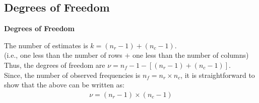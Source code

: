 \documentclass[compress]{beamer}        %
\makeatletter
\newcommand{\tcb}{\textcolor{beamer@blendedblue}}
\makeatother
\begin{document}
\subsection{Degrees of Freedom}
\begin{frame}{\bf \tcb{Degrees of Freedom}}

The number of estimates is $k = (n_r-1) + (n_c - 1)$.\\[0.1cm]
{\footnotesize(i.e., one less than the number of rows $+$ one less than the number of columns)}\\[1cm]

Thus, the degrees of freedom are $\nu = n_f - 1 - [(n_r-1) + (n_c - 1)]$.\\[1cm]

Since, the number of observed frequencies is $n_f = n_r \times n_c$, it is straightforward to show that the above can be written as:\\
\begin{align*}
\boxed{\nu = (n_r - 1) \times (n_c - 1)}
\end{align*}

\end{frame}
\end{document}
